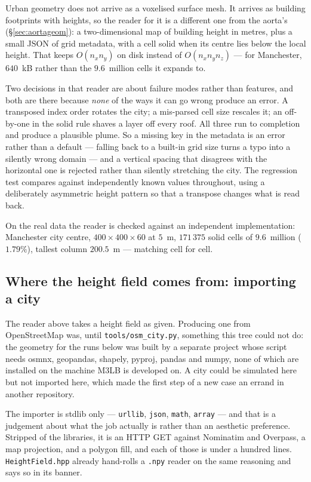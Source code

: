 \documentclass[11pt,a4paper]{article}
\newcommand{\code}[1]{\texttt{\small #1}}
\begin{document}
Urban geometry does not arrive as a voxelised surface mesh. It arrives as
building footprints with heights, so the reader for it is a different one from
the aorta's (\S\ref{sec:aortageom}): a two-dimensional map of building height
in metres, plus a small JSON of grid metadata, with a cell solid when its centre
lies below the local height. That keeps $O(n_x n_y)$ on disk instead of
$O(n_x n_y n_z)$ --- for Manchester, $640$~kB rather than the $9.6$~million
cells it expands to.

Two decisions in that reader are about failure modes rather than features, and
both are there because \emph{none} of the ways it can go wrong produce an
error. A transposed index order rotates the city; a mis-parsed cell size
rescales it; an off-by-one in the solid rule shaves a layer off every roof. All
three run to completion and produce a plausible plume. So a missing key in the
metadata is an error rather than a default --- falling back to a built-in grid
size turns a typo into a silently wrong domain --- and a vertical spacing that
disagrees with the horizontal one is rejected rather than silently stretching
the city. The regression test compares against independently known values
throughout, using a deliberately asymmetric height pattern so that a transpose
changes what is read back.

On the real data the reader is checked against an independent implementation:
Manchester city centre, $400\times400\times60$ at $5$~m, $171\,375$ solid cells
of $9.6$~million ($1.79\%$), tallest column $200.5$~m --- matching cell for
cell.

\subsection{Where the height field comes from: importing a city}
\label{sec:osmimport}

The reader above takes a height field as given. Producing one from
OpenStreetMap was, until \code{tools/osm\_city.py}, something this tree could
not do: the geometry for the runs below was built by a separate project whose
script needs osmnx, geopandas, shapely, pyproj, pandas and numpy, none of which
are installed on the machine M3LB is developed on. A city could be simulated
here but not imported here, which made the first step of a new case an errand
in another repository.

The importer is stdlib only --- \code{urllib}, \code{json}, \code{math},
\code{array} --- and that is a judgement about what the job actually is rather
than an aesthetic preference. Stripped of the libraries, it is an HTTP GET
against Nominatim and Overpass, a map projection, and a polygon fill, and each
of those is under a hundred lines. \code{HeightField.hpp} already hand-rolls a
\code{.npy} reader on the same reasoning and says so in its banner.
\end{document}
